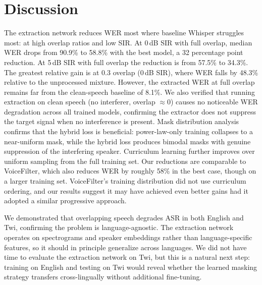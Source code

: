 \documentclass{article}
\begin{document}
\section{Discussion}

The extraction network reduces WER most where baseline Whisper struggles most: at high overlap ratios and low SIR. At 0\,dB SIR with full overlap, median WER drops from 90.9\% to 58.8\% with the best model, a 32 percentage point reduction. At 5\,dB SIR with full overlap the reduction is from 57.5\% to 34.3\%. The greatest relative gain is at 0.3 overlap (0\,dB SIR), where WER falls by 48.3\% relative to the unprocessed mixture. However, the extracted WER at full overlap remains far from the clean-speech baseline of 8.1\%. We also verified that running extraction on clean speech (no interferer, overlap $\approx 0$) causes no noticeable WER degradation across all trained models, confirming the extractor does not suppress the target signal when no interference is present. Mask distribution analysis confirms that the hybrid loss is beneficial: power-law-only training collapses to a near-uniform mask, while the hybrid loss produces bimodal masks with genuine suppression of the interfering speaker. Curriculum learning further improves over uniform sampling from the full training set. Our reductions are comparable to VoiceFilter, which also reduces WER by roughly 58\% in the best case, though on a larger training set. VoiceFilter's training distribution did not use curriculum ordering, and our results suggest it may have achieved even better gains had it adopted a similar progressive approach.

We demonstrated that overlapping speech degrades ASR in both English and Twi, confirming the problem is language-agnostic. The extraction network operates on spectrograms and speaker embeddings rather than language-specific features, so it should in principle generalize across languages. We did not have time to evaluate the extraction network on Twi, but this is a natural next step: training on English and testing on Twi would reveal whether the learned masking strategy transfers cross-lingually without additional fine-tuning.
\end{document}
